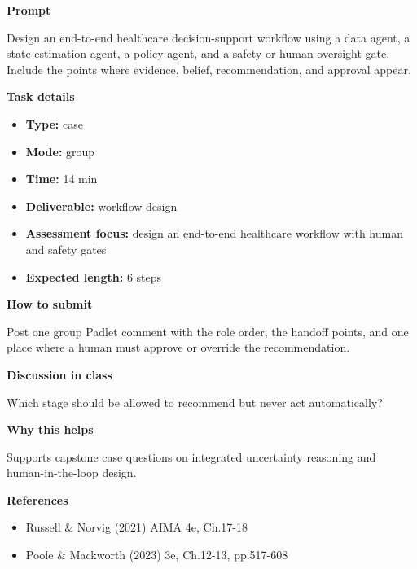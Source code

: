 \documentclass[11pt]{article}
\begin{document}
\begin{tcolorbox}[colback=white,colframe=MidnightBlue,title={Q4 Collaborative Mini-Case},fonttitle=\bfseries,breakable]
\begin{center}
\end{center}

{\large\bfseries\color{MidnightBlue} Prompt}\par\medskip
Design an end-to-end healthcare decision-support workflow using a data agent, a state-estimation agent, a policy agent, and a safety or human-oversight gate. Include the points where evidence, belief, recommendation, and approval appear.

{\large\bfseries\color{MidnightBlue} Task details}\par\medskip
\begin{itemize}\item \textbf{Type:} case
\item \textbf{Mode:} group
\item \textbf{Time:} 14 min
\item \textbf{Deliverable:} workflow design
\item \textbf{Assessment focus:} design an end-to-end healthcare workflow with human and safety gates
\item \textbf{Expected length:} 6 steps\end{itemize}

{\large\bfseries\color{MidnightBlue} How to submit}\par\medskip
Post one group Padlet comment with the role order, the handoff points, and one place where a human must approve or override the recommendation.

{\large\bfseries\color{MidnightBlue} Discussion in class}\par\medskip
Which stage should be allowed to recommend but never act automatically?

{\large\bfseries\color{MidnightBlue} Why this helps}\par\medskip
Supports capstone case questions on integrated uncertainty reasoning and human-in-the-loop design.

{\large\bfseries\color{MidnightBlue} References}\par\medskip
\begin{itemize}\item Russell \& Norvig (2021) AIMA 4e, Ch.17-18
\item Poole \& Mackworth (2023) 3e, Ch.12-13, pp.517-608\end{itemize}
\end{tcolorbox}
\end{document}
